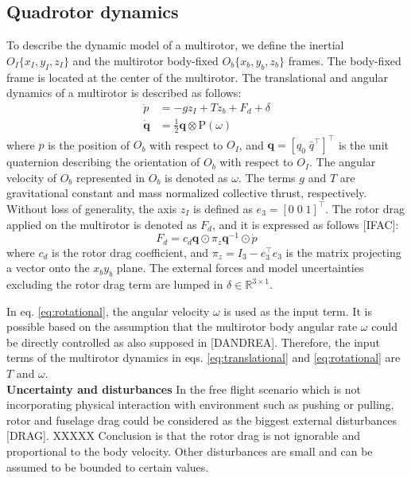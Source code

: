 \documentclass[letterpaper, 10 pt, conference]{ieeeconf}  %
\begin{document}
\subsection{Quadrotor dynamics}
To describe the dynamic model of a multirotor, we define the inertial $O_I\{x_I,y_I,z_I\}$ and the multirotor body-fixed $O_b\{x_b,y_b,z_b\}$ frames. The body-fixed frame is located at the center of the multirotor. 
The translational and angular dynamics of a multirotor is described as follows:
\begin{align}
\ddot{p} &= -gz_I + Tz_b + F_d + \delta \label{eq:translational} \\
\dot{\textbf{q}} &= \textstyle{\frac{1}{2}}\textbf{q}\otimes \text{P}(\omega) \label{eq:rotational}
\end{align}
where $p$ is the position of $O_b$ with respect to $O_I$, and $\textbf{q} = [q_0\;\bar{q}^\top]^\top$ is the unit quaternion describing the orientation of $O_b$ with respect to $O_I$.
The angular velocity of $O_b$ represented in $O_b$ is denoted as $\omega$.
The terms $g$ and $T$ are gravitational constant and mass normalized collective thrust, respectively. 
Without loss of generality, the axis $z_I$ is defined as $e_3 = [0\;0\;1]^\top$.
The rotor drag applied on the multirotor is denoted as $F_d$, and it is expressed as follows [IFAC]:
\begin{equation}
F_d = c_d\textbf{q}\odot\pi_z\textbf{q}^{-1}\odot \dot{p} \label{eq:rotorDrag}
\end{equation}
where $c_d$ is the rotor drag coefficient, and $\pi_z = I_3 - e_3^\top e_3$ is the matrix projecting a vector onto the $x_by_b$ plane.
The external forces and model uncertainties excluding the rotor drag term are lumped in $\delta \in \mathbb{R}^{3\times 1}$. 

In eq. \eqref{eq:rotational}, the angular velocity $\omega$ is used as the input term. 
It is possible based on the assumption that the multirotor body angular rate $\omega$ could be directly controlled as also supposed in [DANDREA].
Therefore, the input terms of the multirotor dynamics in eqs. \eqref{eq:translational} and \eqref{eq:rotational} are $T$ and $\omega$.
\\
\textbf{Uncertainty and disturbances}
In the free flight scenario which is not incorporating physical interaction with environment such as pushing or pulling, rotor and fuselage drag could be considered as the biggest external disturbances [DRAG].
XXXXX
Conclusion is that the rotor drag is not ignorable and proportional to the body velocity.
Other disturbances are small and can be assumed to be bounded to certain values.
\end{document}
